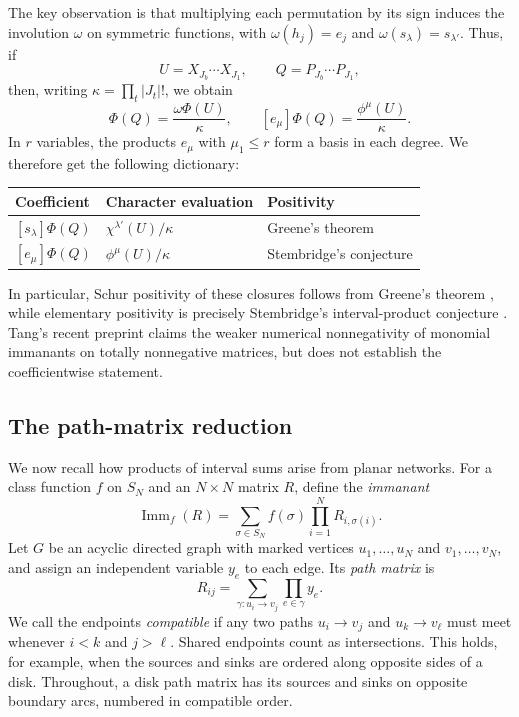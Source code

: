 \documentclass[11pt]{article}
\theoremstyle{definition}
\theoremstyle{remark}
\newcommand{\Imm}{\operatorname{Imm}}
\begin{document}
The key observation is that multiplying each
permutation by its sign induces the involution
$\omega$ on symmetric functions, with
$\omega(h_j)=e_j$ and $\omega(s_\lambda)=s_{\lambda'}$.
Thus, if
\[
U=X_{J_b}\cdots X_{J_1},\qquad
Q=P_{J_b}\cdots P_{J_1},
\]
then, writing $\kappa=\prod_t|J_t|!$, we obtain
\begin{equation}\label{eq:sign-twist}
\Phi(Q)=\frac{\omega\Phi(U)}{\kappa},
\qquad
[e_\mu]\Phi(Q)=\frac{\phi^\mu(U)}{\kappa}.
\end{equation}
In $r$ variables, the products $e_\mu$ with
$\mu_1\le r$ form a basis in each degree.
We therefore get the following dictionary:
\begin{center}
\begin{tabular}{lll}
\toprule
Coefficient & Character evaluation & Positivity\\
\midrule
$[s_\lambda]\Phi(Q)$ &
$\chi^{\lambda'}(U)/\kappa$ &
Greene's theorem\\
$[e_\mu]\Phi(Q)$ &
$\phi^\mu(U)/\kappa$ &
Stembridge's conjecture\\
\bottomrule
\end{tabular}
\end{center}
In particular, Schur positivity of these closures
follows from Greene's theorem \cite{GJ,Greene},
while elementary positivity is precisely Stembridge's
interval-product conjecture
\cite[Conjecture~5.2]{Stembridge92}.
Tang's recent preprint \cite{Tang} claims the weaker
numerical nonnegativity of monomial immanants on
totally nonnegative matrices, but does not establish
the coefficientwise statement.




\subsection{The path-matrix reduction}

We now recall how products of interval sums arise
from planar networks. For a class function $f$ on
$S_N$ and an $N\times N$ matrix $R$, define the
\emph{immanant}
\[
\Imm_f(R)=\sum_{\sigma\in S_N}
f(\sigma)\prod_{i=1}^N R_{i,\sigma(i)}.
\]
Let $G$ be an acyclic directed graph with marked
vertices $u_1,\ldots,u_N$ and $v_1,\ldots,v_N$,
and assign an independent variable $y_e$ to each edge.
Its \emph{path matrix} is
\[
R_{ij}=\sum_{\gamma:u_i\to v_j}
\prod_{e\in\gamma}y_e.
\]
We call the endpoints \emph{compatible} if any two
paths $u_i\to v_j$ and $u_k\to v_\ell$ must meet
whenever $i<k$ and $j>\ell$. Shared endpoints
count as intersections. This holds, for example,
when the sources and sinks are ordered along
opposite sides of a disk. Throughout, a disk path matrix has its sources and sinks
on opposite boundary arcs, numbered in compatible order.
\end{document}
